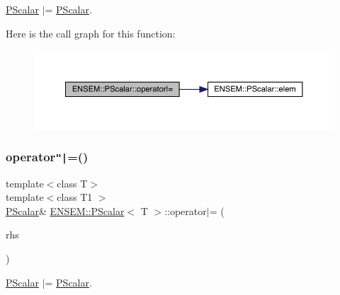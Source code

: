 \mbox{\hyperlink{classENSEM_1_1PScalar}{P\+Scalar}} $\vert$= \mbox{\hyperlink{classENSEM_1_1PScalar}{P\+Scalar}}. 

Here is the call graph for this function\+:
\nopagebreak
\begin{figure}[H]
\begin{center}
\leavevmode
\includegraphics[width=350pt]{d3/d27/classENSEM_1_1PScalar_a59ee3adbb8dabcfb25aae9f9390dcef0_cgraph}
\end{center}
\end{figure}
\mbox{\label{classENSEM_1_1PScalar_a59ee3adbb8dabcfb25aae9f9390dcef0}} 
\subsubsection{\texorpdfstring{operator\texttt{"|}=()}{operator|=()}\hspace{0.1cm}{\footnotesize\ttfamily [2/3]}}
{\footnotesize\ttfamily template$<$class T$>$ \\
template$<$class T1 $>$ \\
\mbox{\hyperlink{classENSEM_1_1PScalar}{P\+Scalar}}\& \mbox{\hyperlink{classENSEM_1_1PScalar}{E\+N\+S\+E\+M\+::\+P\+Scalar}}$<$ T $>$\+::operator$\vert$= (\begin{DoxyParamCaption}\item[{const \mbox{\hyperlink{classENSEM_1_1PScalar}{P\+Scalar}}$<$ T1 $>$ \&}]{rhs }\end{DoxyParamCaption})\hspace{0.3cm}{\ttfamily [inline]}}



\mbox{\hyperlink{classENSEM_1_1PScalar}{P\+Scalar}} $\vert$= \mbox{\hyperlink{classENSEM_1_1PScalar}{P\+Scalar}}. 

